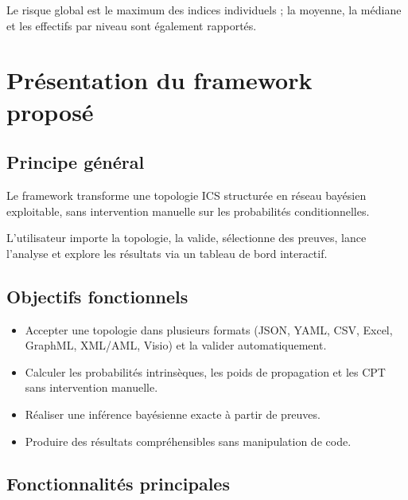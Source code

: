 \documentclass[12pt,a4paper]{article}
\newcommand{\forcereset}[1]{}
\begin{document}
Le risque global est le maximum des indices individuels ; la moyenne, la médiane et les effectifs par niveau sont également rapportés.

\section{Présentation du framework proposé}
\forcereset{6}

\subsection{Principe général}
\forcereset{4}

Le framework transforme une topologie ICS structurée en réseau bayésien exploitable, sans intervention manuelle sur les probabilités conditionnelles.

L'utilisateur importe la topologie, la valide, sélectionne des preuves, lance l'analyse et explore les résultats via un tableau de bord interactif.

\subsection{Objectifs fonctionnels}
\forcereset{5}

\begin{itemize}[leftmargin=1.2cm, itemsep=0.2\baselineskip]
    \item Accepter une topologie dans plusieurs formats (JSON, YAML, CSV, Excel, GraphML, XML/AML, Visio) et la valider automatiquement.
    \item Calculer les probabilités intrinsèques, les poids de propagation et les CPT sans intervention manuelle.
    \item Réaliser une inférence bayésienne exacte à partir de preuves.
    \item Produire des résultats compréhensibles sans manipulation de code.
\end{itemize}

\subsection{Fonctionnalités principales}
\forcereset{5}
\end{document}
